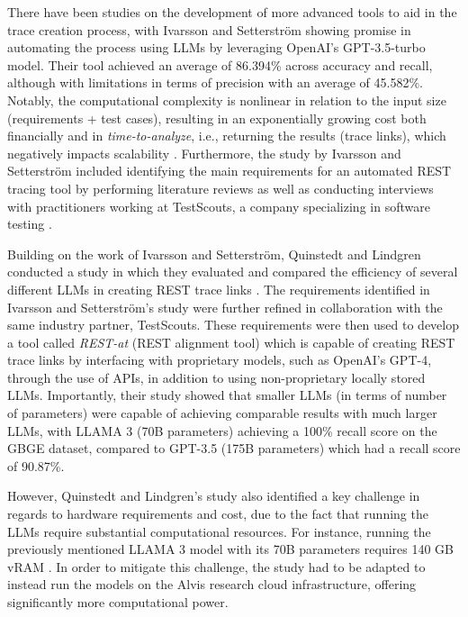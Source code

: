 \documentclass[conference]{IEEEtran}
\begin{document}
There have been studies on the development of more advanced tools to aid in the trace creation process, with Ivarsson and Setterström showing promise in automating the process using LLMs by leveraging OpenAI’s GPT-3.5-turbo model\cite{ivarsson2023automated}. Their tool achieved an average of 86.394\% across accuracy and recall, although with limitations in terms of precision with an average of 45.582\%. Notably, the computational complexity is nonlinear in relation to the input size (requirements + test cases), resulting in an exponentially growing cost both financially and in \textit{time-to-analyze}, i.e., returning the results (trace links), which negatively impacts scalability \cite{ivarsson2023automated}. Furthermore, the study by Ivarsson and Setterström included identifying the main requirements for an automated REST tracing tool by performing literature reviews as well as conducting interviews with practitioners working at TestScouts, a company specializing in software testing \cite{ivarsson2023automated}.

Building on the work of Ivarsson and Setterström, Quinstedt and Lindgren conducted a study in which they evaluated and compared the efficiency of several different LLMs in creating REST trace links \cite{quinstedt2024Optimizing}. The requirements identified in Ivarsson and Setterström's study \cite{ivarsson2023automated} were further refined in collaboration with the same industry partner, TestScouts. These requirements were then used to develop a tool called \textit{REST-at} (REST alignment tool) which is capable of creating REST trace links by interfacing with proprietary models, such as OpenAI's GPT-4, through the use of APIs, in addition to using non-proprietary locally stored LLMs. Importantly, their study showed that smaller LLMs (in terms of number of parameters) were capable of achieving comparable results with much larger LLMs, with LLAMA 3 (70B parameters) achieving a 100\% recall score on the GBGE dataset, compared to GPT-3.5 (175B parameters) which had a recall score of 90.87\%.

However, Quinstedt and Lindgren's study also identified a key challenge in regards to hardware requirements and cost, due to the fact that running the LLMs require substantial computational resources. For instance, running the previously mentioned LLAMA 3 model with its 70B parameters requires 140 GB vRAM \cite{quinstedt2024Optimizing}. In order to mitigate this challenge, the study had to be adapted to instead run the models on the Alvis research cloud  infrastructure, offering significantly more computational power.
\end{document}
